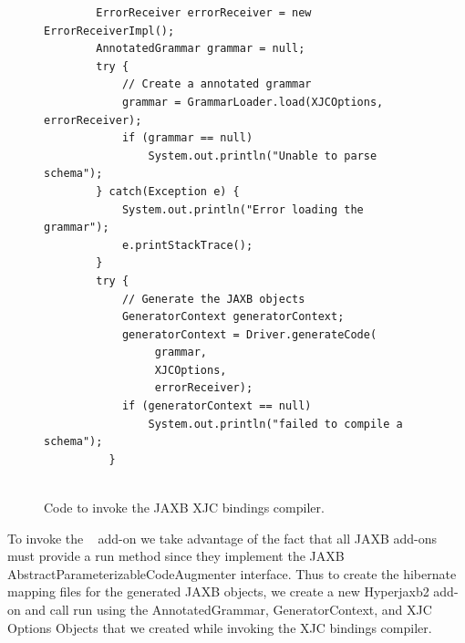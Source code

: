 \begin{figure}[htbp]
\begin{center}
\begin{verbatim}     
        ErrorReceiver errorReceiver = new ErrorReceiverImpl();
        AnnotatedGrammar grammar = null;
        try {
            // Create a annotated grammar
            grammar = GrammarLoader.load(XJCOptions, errorReceiver);
            if (grammar == null)
                System.out.println("Unable to parse schema");
        } catch(Exception e) {
            System.out.println("Error loading the grammar");
            e.printStackTrace(); 
        }
        try {
            // Generate the JAXB objects
            GeneratorContext generatorContext;
            generatorContext = Driver.generateCode(
                 grammar, 
                 XJCOptions, 
                 errorReceiver);
            if (generatorContext == null)
                System.out.println("failed to compile a schema");
          }
        
\end{verbatim}

\caption{Code to invoke the JAXB XJC bindings compiler.}
\label{XJCsamplecode}
\end{center}
\end{figure}

To invoke the ~ add-on we take advantage of the fact that all JAXB add-ons must provide a run method since they implement the JAXB AbstractParameterizableCodeAugmenter interface.  Thus to create the hibernate mapping files for the generated JAXB objects, we create a new Hyperjaxb2 add-on and call run using the AnnotatedGrammar, GeneratorContext,  and XJC Options Objects that we created while invoking the XJC bindings compiler. 

